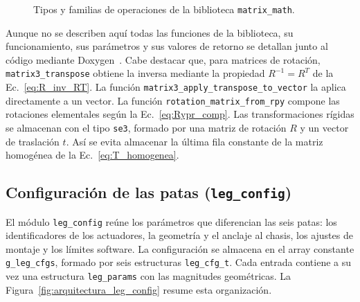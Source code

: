 \begin{figure}[H]
{}
    \captionsetup{justification=centering,singlelinecheck=false}
    \caption[Organización de la biblioteca \texttt{matrix\_math}]
    {Tipos y familias de operaciones de la biblioteca \texttt{matrix\_math}.}
    \label{fig:arquitectura_matrix_math}
\end{figure}
\vspace{-1\baselineskip}

Aunque no se describen aquí todas las funciones de la biblioteca, su
funcionamiento, sus parámetros y sus valores de retorno se detallan junto al
código mediante Doxygen~\cite{doxygen}. Cabe destacar que, para matrices de
rotación, \texttt{matrix3\_transpose} obtiene la inversa
mediante la propiedad $R^{-1}=R^{T}$ de la
Ec.~\ref{eq:R_inv_RT}. La función
\texttt{matrix3\_apply\_transpose\_to\_vector} la aplica directamente a un
vector. La función
\texttt{rotation\_matrix\_from\_rpy} compone las rotaciones elementales según
la Ec.~\ref{eq:Rypr_comp}. Las transformaciones rígidas se almacenan con
el tipo \texttt{se3}, formado por una matriz de rotación $R$ y un
vector de traslación $t$. Así se evita almacenar la última fila constante
de la matriz homogénea de la Ec.~\ref{eq:T_homogenea}.

\subsection{Configuración de las patas (\texttt{leg\_config})}
\label{subsec:leg_config}

El módulo \texttt{leg\_config} reúne los parámetros que diferencian las seis
patas: los identificadores de los actuadores, la geometría y el anclaje al
chasis, los ajustes de montaje y los límites software. La configuración se
almacena en el array constante \texttt{g\_leg\_cfgs}, formado por seis
estructuras \texttt{leg\_cfg\_t}. Cada entrada contiene a su vez una estructura
\texttt{leg\_params} con las magnitudes geométricas. La
Figura~\ref{fig:arquitectura_leg_config} resume esta organización.


